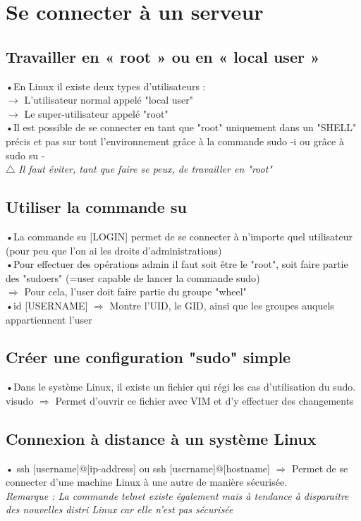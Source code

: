\documentclass[a4paper, 11pt, french, oneside]{book}
\begin{document}
	\chapter{Se connecter à un serveur}
		\section{Travailler en « root » ou en « local user »}
			•En Linux il existe deux types d'utilisateurs :\\
			$\rightarrow$ L'utilisateur normal appelé "local user"\\
			$\rightarrow$ Le super-utilisateur appelé "root"\\
			•Il est possible de se connecter en tant que "root" uniquement dans un "SHELL" précis et pas sur tout
			l’environnement grâce à la commande \color{red}sudo -i {\color{black}ou} grâce à sudo su -\\ 
			$\triangle$ 
			\textit{\color{black}
			Il faut éviter, tant que faire se peux, de travailler en "root"}\\
			\color{black}
		\section{Utiliser la commande su}
			•La commande {\color{red}su [LOGIN]} permet de se connecter à n'importe quel utilisateur (pour peu que l'on ai les droits d'administrations)\\
			•Pour effectuer des opérations admin il faut soit être le "root", soit faire partie des "sudoers" (=user capable de lancer la commande {\color{red}sudo})\\
			$\Rightarrow$ Pour cela, l'user doit faire partie du groupe "wheel"\\
			•{\color{red}id [USERNAME]} $\Rightarrow$ Montre l'UID, le GID, ainsi que les groupes auquels appartiennent l'user\\
			\pagebreak 	
		\section{Créer une configuration "sudo" simple}
			•Dans le système Linux, il existe un fichier qui régi les cas d’utilisation du sudo.\\
			{\color{red}visudo} $\Rightarrow$ Permet d'ouvrir ce fichier avec VIM et d'y effectuer des changements\\
		\section{Connexion à distance à un système Linux}
		    •\color{red}
			ssh [username]@[ip-address] {\color{black}ou} ssh [username]@[hostname] 
			\color{black}
			$\Rightarrow$ Permet de se connecter d'une machine Linux à une autre de manière sécurisée.\\
			\textit{Remarque : La commande {\color{red}telnet} existe également mais à tendance à disparaitre des nouvelles distri Linux car elle n'est pas sécurisée}
			\pagebreak 
\end{document}
